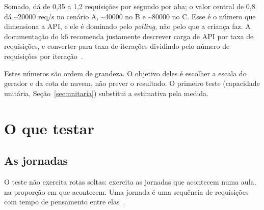 \documentclass[11pt, a4paper, oneside, openany]{report}
\begin{document}
Somado, dá de 0,35 a 1,2 requisições por segundo por aba; o valor central de
0,8 dá \textasciitilde\num{20000} req/s no cenário A,
\textasciitilde\num{40000} no B e \textasciitilde\num{80000} no C. Esse é o
número que dimensiona a API, e ele é dominado pelo \emph{polling}, não pelo que
a criança faz. A documentação do k6 recomenda justamente descrever carga de API
por taxa de requisições, e converter para taxa de iterações dividindo pelo
número de requisições por iteração~\cite{k6apitesting}.

\begin{atencao}
Estes números são ordem de grandeza. O objetivo deles é escolher a escala do
gerador e da cota de nuvem, não prever o resultado. O primeiro teste
(capacidade unitária, Seção~\ref{sec:unitaria}) substitui a estimativa pela
medida.
\end{atencao}

\chapter{O que testar}
\label{cap:oque}

\section{As jornadas}

O teste não exercita rotas soltas: exercita as jornadas que acontecem numa
aula, na proporção em que acontecem. Uma jornada é uma sequência de requisições
com tempo de pensamento entre elas~\cite{meier2007cap12}.
\end{document}
